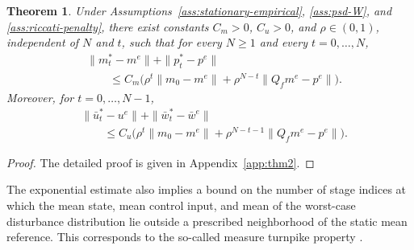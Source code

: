 \documentclass[10pt,journal,twoside]{IEEEtran}
\newtheorem{theorem}{Theorem}
\theoremstyle{definition}
\theoremstyle{remark}
\begin{document}
\begin{theorem}
	\label{thm:affine-mean-turnpike}
	Under Assumptions~\ref{ass:stationary-empirical}, 
	\ref{ass:psd-W},
	and \ref{ass:riccati-penalty}, there exist constants
	\(C_m>0\), \(C_u>0\),  and \(\rho\in(0,1)\), independent of
	\(N\) and \(t\), such that for every \(N\ge 1\) and every
	\(t=0,\ldots,N\),
	\begin{equation}
		\begin{aligned}
			&\|m_t^*-m^e\|
			+\|p_t^*-p^e\|       \\
			&\qquad\le
			C_m
			\Big(
			\rho^t\|m_0-m^e\|
			+
			\rho^{N-t}\|Q_fm^e-p^e\|
			\Big).
		\end{aligned}
		\label{eq:two-sided-mp}
	\end{equation}
	Moreover, for \(t=0,\ldots,N-1\),
	\begin{equation}
		\begin{aligned}
			&\|\bar{u}_t^*-u^e\|
			+\|\bar{w}_t^*-\bar w^e\|       \\
			&\qquad\le
			C_u
			\Big(
			\rho^t\|m_0-m^e\|
			+
			\rho^{N-t-1}\|Q_fm^e-p^e\|
			\Big).
		\end{aligned}
		\label{eq:two-sided-uw}
	\end{equation}
\end{theorem}

\begin{proof}
	{The detailed proof is given in
	Appendix~\ref{app:thm2}.}
\end{proof}

The exponential estimate also implies a bound on the number of stage indices at which the mean state, mean control input, and mean of the
worst-case disturbance distribution lie outside a prescribed neighborhood of the static mean reference. This corresponds to the so-called measure turnpike property \cite{BerberichEtAl2018}.
\end{document}

